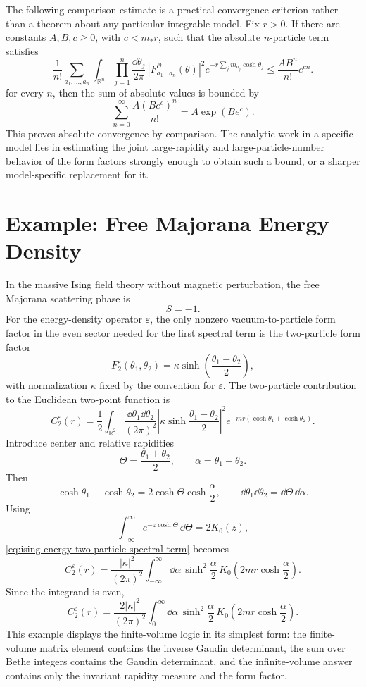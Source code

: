 The following comparison estimate is a practical convergence criterion rather
than a theorem about any particular integrable model.  Fix \(r>0\).  If there
are constants \(A,B,c\ge0\), with \(c<m_\ast r\), such that the absolute
\(n\)-particle term satisfies
\[
  \frac{1}{n!}
  \sum_{a_1,\ldots,a_n}
  \int_{\mathbb R^n}
  \prod_{j=1}^n\frac{\dd\theta_j}{2\pi}\,
  |F^{\mathcal O}_{a_1\ldots a_n}(\theta)|^2
  e^{-r\sum_jm_{a_j}\cosh\theta_j}
  \le
  \frac{A B^n}{n!}e^{cn}.
\]
for every \(n\), then the sum of absolute values is bounded by
\[
  \sum_{n=0}^\infty \frac{A(B e^c)^n}{n!}
  =
  A\exp(Be^c).
\]
This proves absolute convergence by comparison.  The analytic work in a
specific model lies in estimating the joint large-rapidity and
large-particle-number behavior of the form factors strongly enough to obtain
such a bound, or a sharper model-specific replacement for it.

\section{Example: Free Majorana Energy Density}

In the massive Ising field theory without magnetic perturbation, the free
Majorana scattering phase is
\[
  S=-1.
\]
For the energy-density operator \(\varepsilon\), the only nonzero
vacuum-to-particle form factor in the even sector needed for the first
spectral term is the two-particle form factor
\[
  F_2^\varepsilon(\theta_1,\theta_2)
  =
  \kappa\sinh\left(\frac{\theta_1-\theta_2}{2}\right),
\]
with normalization \(\kappa\) fixed by the convention for
\(\varepsilon\).  The two-particle contribution to the Euclidean two-point
function is
\begin{equation}
  C_2^\varepsilon(r)
  =
  \frac12
  \int_{\mathbb R^2}
  \frac{\dd\theta_1\dd\theta_2}{(2\pi)^2}
  \left|
    \kappa\sinh\frac{\theta_1-\theta_2}{2}
  \right|^2
  e^{-mr(\cosh\theta_1+\cosh\theta_2)} .
  \label{eq:ising-energy-two-particle-spectral-term}
\end{equation}
Introduce center and relative rapidities
\[
  \Theta=\frac{\theta_1+\theta_2}{2},
  \qquad
  \alpha=\theta_1-\theta_2.
\]
Then
\[
  \cosh\theta_1+\cosh\theta_2
  =
  2\cosh\Theta\cosh\frac{\alpha}{2},
  \qquad
  \dd\theta_1\dd\theta_2=\dd\Theta\,\dd\alpha.
\]
Using
\[
  \int_{-\infty}^{\infty}
  e^{-z\cosh\Theta}\,\dd\Theta
  =
  2K_0(z),
\]
\eqref{eq:ising-energy-two-particle-spectral-term} becomes
\[
  C_2^\varepsilon(r)
  =
  \frac{|\kappa|^2}{(2\pi)^2}
  \int_{-\infty}^{\infty}
  \dd\alpha\,
  \sinh^2\frac{\alpha}{2}\,
  K_0\!\left(2mr\cosh\frac{\alpha}{2}\right).
\]
Since the integrand is even,
\[
  C_2^\varepsilon(r)
  =
  \frac{2|\kappa|^2}{(2\pi)^2}
  \int_0^\infty
  \dd\alpha\,
  \sinh^2\frac{\alpha}{2}\,
  K_0\!\left(2mr\cosh\frac{\alpha}{2}\right).
\]
This example displays the finite-volume logic in its simplest form: the
finite-volume matrix element contains the inverse Gaudin determinant, the sum
over Bethe integers contains the Gaudin determinant, and the infinite-volume
answer contains only the invariant rapidity measure and the form factor.

